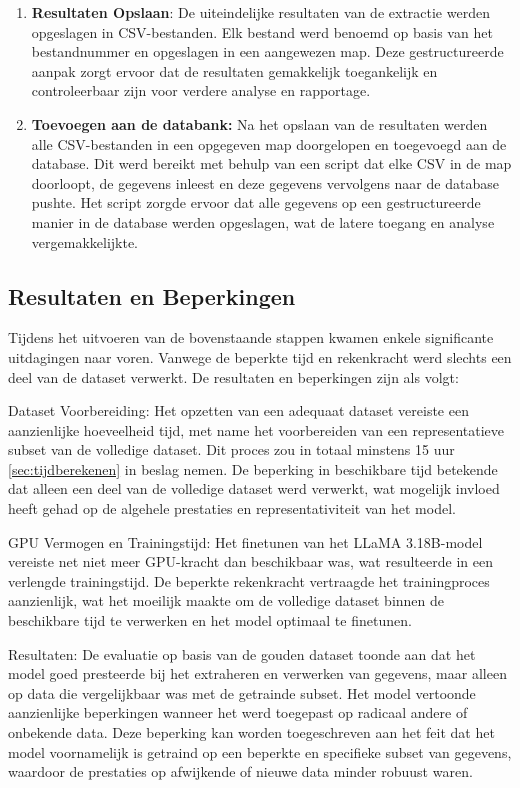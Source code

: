 \begin{enumerate}
\item \textbf{Resultaten Opslaan}:
De uiteindelijke resultaten van de extractie werden opgeslagen in CSV-bestanden. Elk bestand werd benoemd op basis van het bestandnummer en opgeslagen in een aangewezen map. Deze gestructureerde aanpak zorgt ervoor dat de resultaten gemakkelijk toegankelijk en controleerbaar zijn voor verdere analyse en rapportage.

\item \textbf{Toevoegen aan de databank: }Na het opslaan van de resultaten werden alle CSV-bestanden in een opgegeven map doorgelopen en toegevoegd aan de database. Dit werd bereikt met behulp van een script dat elke CSV in de map doorloopt, de gegevens inleest en deze gegevens vervolgens naar de database pushte. Het script zorgde ervoor dat alle gegevens op een gestructureerde manier in de database werden opgeslagen, wat de latere toegang en analyse vergemakkelijkte.

\end{enumerate}

\subsection{Resultaten en Beperkingen}

Tijdens het uitvoeren van de bovenstaande stappen kwamen enkele significante uitdagingen naar voren. Vanwege de beperkte tijd en rekenkracht werd slechts een deel van de dataset verwerkt. De resultaten en beperkingen zijn als volgt:

Dataset Voorbereiding:
Het opzetten van een adequaat dataset vereiste een aanzienlijke hoeveelheid tijd, met name het voorbereiden van een representatieve subset van de volledige dataset. Dit proces zou in totaal minstens 15 uur \autoref{sec:tijdberekenen} in beslag nemen. De beperking in beschikbare tijd betekende dat alleen een deel van de volledige dataset werd verwerkt, wat mogelijk invloed heeft gehad op de algehele prestaties en representativiteit van het model.

GPU Vermogen en Trainingstijd:
Het finetunen van het LLaMA 3.18B-model vereiste net niet meer GPU-kracht dan beschikbaar was, wat resulteerde in een verlengde trainingstijd. De beperkte rekenkracht vertraagde het trainingproces aanzienlijk, wat het moeilijk maakte om de volledige dataset binnen de beschikbare tijd te verwerken en het model optimaal te finetunen.

Resultaten:
De evaluatie op basis van de gouden dataset toonde aan dat het model goed presteerde bij het extraheren en verwerken van gegevens, maar alleen op data die vergelijkbaar was met de getrainde subset. Het model vertoonde aanzienlijke beperkingen wanneer het werd toegepast op radicaal andere of onbekende data. Deze beperking kan worden toegeschreven aan het feit dat het model voornamelijk is getraind op een beperkte en specifieke subset van gegevens, waardoor de prestaties op afwijkende of nieuwe data minder robuust waren.




